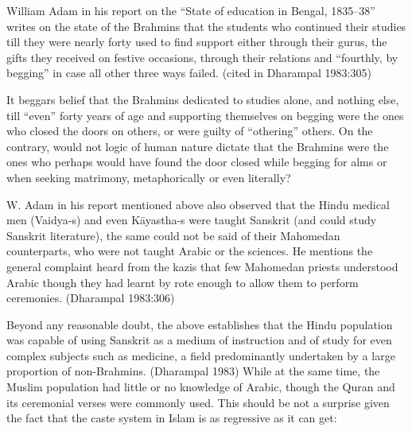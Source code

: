William Adam in his report on the “State of education in Bengal, 1835–38” writes on the state of the Brahmins that the students who continued their studies till they were nearly forty used to find support either through their gurus, the gifts they received on festive occasions, through their relations and “fourthly, by begging” in case all other three ways failed. (cited in Dharampal 1983:305)

It beggars belief that the Brahmins dedicated to studies alone, and nothing else, till “even” forty years of age and supporting themselves on begging were the ones who closed the doors on others, or were guilty of “othering” others. On the contrary, would not logic of human nature dictate that the Brahmins were the ones who perhaps would have found the door closed while begging for alms or when seeking matrimony, metaphorically or even literally?

W. Adam in his report mentioned above also observed that the Hindu medical men (Vaidya-s) and even Kāyastha-s were taught Sanskrit (and could study Sanskrit literature), the same could not be said of their Mahomedan counterparts, who were not taught Arabic or the sciences. He mentions the general complaint heard from the kazis that few Mahomedan priests understood Arabic though they had learnt by rote enough to allow them to perform ceremonies. (Dharampal 1983:306)

Beyond any reasonable doubt, the above establishes that the Hindu population was capable of using Sanskrit as a medium of instruction and of study for even complex subjects such as medicine, a field predominantly undertaken by a large proportion of non-Brahmins. (Dharampal 1983) While at the same time, the Muslim population had little or no knowledge of Arabic, though the Quran and its ceremonial verses were commonly used. This should be not a surprise given the fact that the caste system in Islam is as regressive as it can get:

